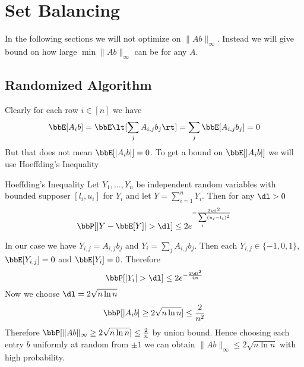 \section{Set Balancing}
\begin{algoprob}
\end{algoprob}

In the following sections we will not optimize on $\|Ab\|_{\infty}$. Instead we will give bound on how large $\min \|Ab\|_{\infty}$ can be for any $A$.

\subsection{Randomized Algorithm}
\begin{algorithm}
	\DontPrintSemicolon
	\caption{}
\end{algorithm}
Clearly for each row $i\in[n]$ we have $$\bbE[A_ib]=\bbE\lt[\sum_jA_{i,j}b_j\rt]=\sum_j\bbE[A_{i,j}b_j]=0$$But that does not mean $\bbE[|A_ib|]=0$. To get a bound on $\bbE[|A_ib|]$ we will use Hoeffding's Inequality

\begin{Theorem}{Hoeffding's Inequality}{}
	Let $Y_1,\dots, Y_n$ be independent random variables with bounded supposer $[l_i,u_i]$ for $Y_i$ and let $Y=\sum\limits_{i=1}^n Y_i$. Then for any $\dl>0$ $$\bbP[|Y-\bbE[Y]|>\dl]\leq 2e^{-\frac{2\dl^2}{\sum\limits_i(u_i-l_i)^2}}$$
\end{Theorem}

In our case we have $Y_{i,j}=A_{i,j}b_j$ and $Y_i=\sum\limits_j A_{i,j}b_j$. Then each $Y_{i,j}\in \{-1,0,1\}$, $\bbE[Y_{i,j}]=0$ and $\bbE[Y_i]=0$. Therefore $$\bbP[|Y_i|>\dl]\leq 2e^{-\frac{2\dl^2}{4n}}$$Now we choose $\dl=2\sqrt{n\ln n}$ $$\bbP[|A_ib|\geq 2\sqrt{n\ln n}]\leq \frac{2}{n^2}$$Therefore $\bbP[\|Ab\|_{\infty}\geq 2\sqrt{n\ln n}]\leq \frac2{n}$ by union bound. Hence choosing each entry $b$ uniformly at random from $\pm 1$ we can obtain $\|Ab\|_{\infty}\leq 2\sqrt{n\ln n}$ with high probability.
